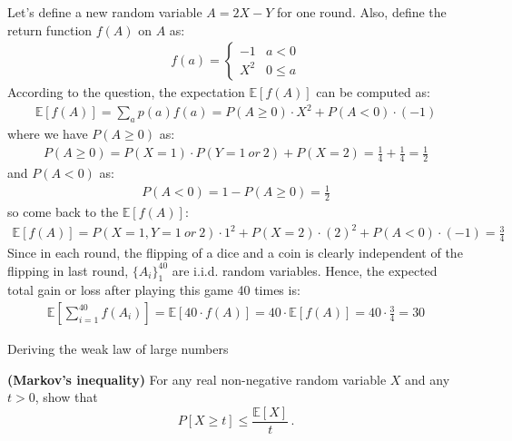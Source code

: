 \documentclass[a4paper,10pt]{article}
\begin{document}
\begin{solution}
Let's define a new random variable $A = 2X - Y$ for one round. Also, define the return function $f(A)$ on $A$ as:
\begin{align}
    f(a) =  \begin{cases}
                -1 & a < 0 \\
                X^2 & 0 \leq a
            \end{cases}
\end{align}
According to the question, the expectation $\mathbb{E}[f(A)]$ can be computed as:
    \begin{align}
        \mathbb{E}[f(A)] = \sum_a p(a) f(a) = P(A \ge 0) \cdot X^{2} + P(A < 0)\cdot(-1)
    \end{align}
where we have $P(A \ge 0)$ as:
    \begin{align}
        P(A \ge 0) = P(X=1)\cdot P(Y=1\ or\ 2 ) + P(X=2) = \frac{1}{4} + \frac{1}{4} = \frac{1}{2}
    \end{align}
and $P(A < 0)$ as:
    \begin{align}
        P(A < 0) = 1 - P(A \ge 0) = \frac{1}{2}
    \end{align}
so come back to the $\mathbb{E}[f(A)]$:
    \begin{align}
        \mathbb{E}[f(A)] = P(X=1,Y=1\ or\ 2) \cdot 1^{2} + P(X=2) \cdot (2)^{2}+P(A<0) \cdot (-1) = \frac{3}{4}
    \end{align}
Since in each round, the flipping of a dice and a coin is clearly independent of the flipping in last round, $\{A_i\}_{1}^{40}$ are i.i.d. random variables. Hence, the expected total gain or loss after playing this game 40 times is:
    \begin{align}
        \mathbb{E}[\sum_{i=1}^{40} f(A_i)]=\mathbb{E}[40 \cdot f(A)]= 40 \cdot \mathbb{E}[f(A)]=40\cdot\frac{3}{4}=30
    \end{align}
\end{solution}












\begin{nproblem}{9}{Deriving the weak law of large numbers}
\end{nproblem}
	\begin{subproblem}{2} \textbf{(Markov's inequality)} For any real non-negative random variable $X$ and any $t > 0$, show that
	\[
	P[X \geq t] \leq \frac{\mathbb{E}[X]}{t}\, .
	\]
\end{subproblem}
\end{document}
